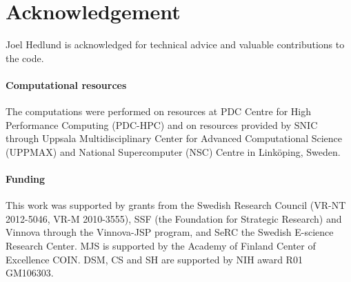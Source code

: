 \documentclass{bioinfo}
\begin{document}
\section*{Acknowledgement}
Joel Hedlund is acknowledged for technical advice and valuable contributions to the code. 

\paragraph{Computational resources\textcolon}
The computations were performed on resources at PDC Centre for High
Performance Computing (PDC-HPC) and on resources provided by SNIC
through Uppsala Multidisciplinary Center for Advanced Computational
Science (UPPMAX) and National Supercomputer (NSC) Centre in Link\"oping,
Sweden.

\paragraph{Funding\textcolon}
This work was supported by grants from the Swedish
Research Council (VR-NT 2012-5046, VR-M 2010-3555), SSF (the Foundation for
Strategic Research) and Vinnova through the Vinnova-JSP program, and SeRC the
Swedish E-science Research Center. MJS is supported by the Academy of Finland Center of Excellence COIN. DSM, CS and SH are supported by NIH award R01 GM106303.


%
%
%
%
%
%
%

\end{document}
